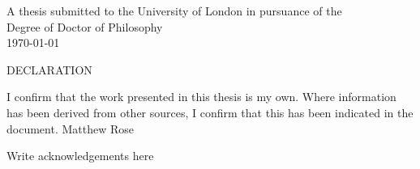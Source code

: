 \documentclass[11pt,a4paper]{report} %
\renewcommand{\chaptermark}[1]{\markboth{#1}{}}
\renewcommand{\sectionmark}[1]{\markright{\thesection\ #1}{}}
\renewcommand{\plainfootrulewidth}{0pt}%
\renewcommand{\baselinestretch}{1.5}
\begin{document}
\begin{titlepage}
\begin{center}
	\vspace{2cm}
				 {A thesis submitted to the University of London in pursuance of the \\Degree of Doctor of Philosophy\\}
				 \vspace{1cm}
{\today\\}
\end{center}
\end{titlepage}

\newpage
\begin{center}
\vspace*{6cm}
{\LARGE DECLARATION} \newline
\vspace*{1cm}
\end{center}
\vspace{1cm}
I confirm that the work presented in this thesis is my own.  Where information has been derived from other sources, I confirm that this has been indicated in the document.\newline \newline \newline 
\vspace{5cm}
Matthew Rose


\begin{abstract}

\end{abstract}

\thispagestyle{empty} %
\begin{center}
Write acknowledgements here



\end{center}
\vspace{1cm}

\tableofcontents
\listoffigures
\listoftables

\newpage

\pagestyle{fancy}
\addtolength{\headwidth}{\marginparsep}
\renewcommand{\chaptermark}[1]{\markboth{#1}{}}
\renewcommand{\sectionmark}[1]{\markright{\thesection\ #1}{}}
\fancyfoot[RO,RE]{\thepage}
\fancyhead[RO]{\leftmark}
\fancyhead[LO]{\rightmark}
\cfoot{}

\fancypagestyle{plain}{\renewcommand{\headrulewidth}{0pt}%
       \renewcommand{\plainfootrulewidth}{0pt}%
        \fancyhead[RO,LO]{}}
\renewcommand{\baselinestretch}{1.5} 

\newpage










\newpage


\end{document}
